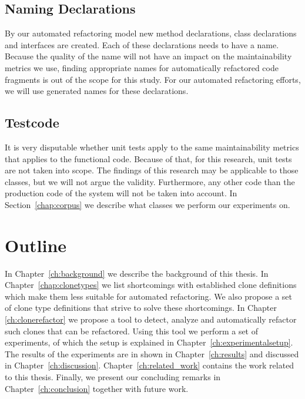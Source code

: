 \subsection{Naming Declarations}
By our automated refactoring model new method declarations, class declarations and interfaces are created. Each of these declarations needs to have a name. Because the quality of the name will not have an impact on the maintainability metrics we use, finding appropriate names for automatically refactored code fragments is out of the scope for this study. For our automated refactoring efforts, we will use generated names for these declarations. %

\subsection{Testcode}
It is very disputable whether unit tests apply to the same maintainability metrics that applies to the functional code. Because of that, for this research, unit tests are not taken into scope. The findings of this research may be applicable to those classes, but we will not argue the validity. Furthermore, any other code than the production code of the system will not be taken into account. In Section~\ref{chap:corpus} we describe what classes we perform our experiments on.

\section{Outline}
In Chapter~\ref{ch:background} we describe the background of this thesis. In Chapter~\ref{chap:clonetypes} we list shortcomings with established clone definitions which make them less suitable for automated refactoring. We also propose a set of clone type definitions that strive to solve these shortcomings. In Chapter \ref{ch:clonerefactor} we propose a tool to detect, analyze and automatically refactor such clones that can be refactored. Using this tool we perform a set of experiments, of which the setup is explained in Chapter~\ref{ch:experimentalsetup}. The results of the experiments are in shown in Chapter~\ref{ch:results} and discussed in Chapter~\ref{ch:discussion}. Chapter~\ref{ch:related_work} contains the work related to this thesis. Finally, we present our concluding remarks in Chapter~\ref{ch:conclusion} together with future work.
